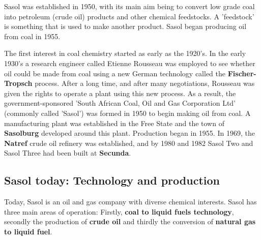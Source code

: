 Sasol was established in 1950, with its main aim being to convert low grade coal into petroleum (crude oil) products and other chemical feedstocks. A 'feedstock' is something that is used to make another product. Sasol began producing oil from coal in 1955.

\begin{IFact}{The first interest in coal chemistry started as early as the 1920's. In the early 1930's a research engineer called Etienne Rousseau was employed to see whether oil could be made from coal using a new German technology called the \textbf{Fischer-Tropsch} process. After a long time, and after many negotiations, Rousseau was given the rights to operate a plant using this new process. As a result, the government-sponsored 'South African Coal, Oil and Gas Corporation Ltd' (commonly called 'Sasol') was formed in 1950 to begin making oil from coal. A manufacturing plant was established in the Free State and the town of \textbf{Sasolburg} developed around this plant. Production began in 1955. In 1969, the \textbf{Natref} crude oil refinery was established, and by 1980 and 1982 Sasol Two and Sasol Three had been built at \textbf{Secunda}.}
\end{IFact}

\subsection{Sasol today: Technology and production}
\label{subsec:chem:technology}

Today, Sasol is an oil and gas company with diverse chemical interests. Sasol has three main areas of operation: Firstly, \textbf{coal to liquid fuels technology}, secondly the production of \textbf{crude oil} and thirdly the conversion of \textbf{natural gas to liquid fuel}.

